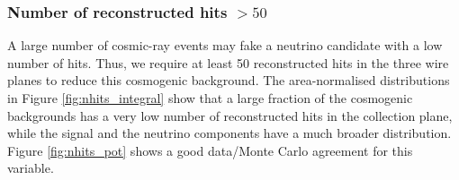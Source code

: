 \subsubsection*{Number of reconstructed hits $> 50$} 
A large number of cosmic-ray events may fake a neutrino candidate with a low number of hits. Thus, we require at least 50 reconstructed hits in the three wire planes to reduce this cosmogenic background. 
The area-normalised distributions in Figure \ref{fig:nhits_integral} show that a large fraction of the cosmogenic backgrounds has a very low number of reconstructed hits in the collection plane, while the signal and the neutrino components have a much broader distribution. Figure \ref{fig:nhits_pot} shows a good data/Monte Carlo agreement for this variable.

